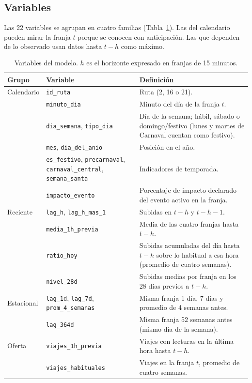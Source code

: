 \documentclass[11pt,a4paper]{article}
\begin{document}
\subsection{Variables}

Las 22 variables se agrupan en cuatro familias (Tabla~\ref{tab:vars}). Las del calendario pueden mirar la franja $t$ porque se conocen con anticipación. Las que dependen de lo observado usan datos hasta $t-h$ como máximo.

\begin{table}[H]
  \centering
  \caption{Variables del modelo. $h$ es el horizonte expresado en franjas de 15 minutos.}
  \label{tab:vars}
  \small
  \renewcommand{\arraystretch}{1.15}
  \begin{tabular}{p{2.3cm} p{3.6cm} p{8.2cm}}
    \toprule
    Grupo & Variable & Definición \\
    \midrule
    Calendario & \texttt{id\_ruta} & Ruta (2, 16 o 21). \\
     & \texttt{minuto\_dia} & Minuto del día de la franja $t$. \\
     & \texttt{dia\_semana}, \texttt{tipo\_dia} & Día de la semana; hábil, sábado o domingo/festivo (lunes y martes de Carnaval cuentan como festivo). \\
     & \texttt{mes}, \texttt{dia\_del\_anio} & Posición en el año. \\
     & \texttt{es\_festivo}, \texttt{precarnaval}, \texttt{carnaval\_central}, \texttt{semana\_santa} & Indicadores de temporada. \\
     & \texttt{impacto\_evento} & Porcentaje de impacto declarado del evento activo en la franja. \\
    \addlinespace
    Reciente & \texttt{lag\_h}, \texttt{lag\_h\_mas\_1} & Subidas en $t-h$ y $t-h-1$. \\
     & \texttt{media\_1h\_previa} & Media de las cuatro franjas hasta $t-h$. \\
     & \texttt{ratio\_hoy} & Subidas acumuladas del día hasta $t-h$ sobre lo habitual a esa hora (promedio de cuatro semanas). \\
     & \texttt{nivel\_28d} & Subidas medias por franja en los 28 días previos a $t-h$. \\
    \addlinespace
    Estacional & \texttt{lag\_1d}, \texttt{lag\_7d}, \texttt{prom\_4\_semanas} & Misma franja 1 día, 7 días y promedio de 4 semanas antes. \\
     & \texttt{lag\_364d} & Misma franja 52 semanas antes (mismo día de la semana). \\
    \addlinespace
    Oferta & \texttt{viajes\_1h\_previa} & Viajes con lecturas en la última hora hasta $t-h$. \\
     & \texttt{viajes\_habituales} & Viajes en la franja $t$, promedio de cuatro semanas. \\
    \bottomrule
  \end{tabular}
\end{table}
\end{document}
